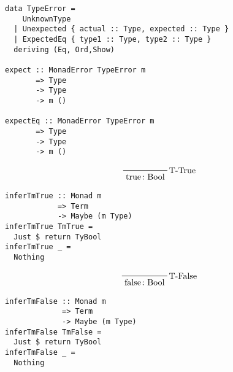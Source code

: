 \documentclass[aspectration=169]{beamer}
\begin{document}
\begin{frame}[fragile]
  \begin{verbatim}
data TypeError =
    UnknownType
  | Unexpected { actual :: Type, expected :: Type }
  | ExpectedEq { type1 :: Type, type2 :: Type }
  deriving (Eq, Ord,Show)

expect :: MonadError TypeError m 
       => Type 
       -> Type 
       -> m ()

expectEq :: MonadError TypeError m 
       => Type 
       -> Type 
       -> m ()
  \end{verbatim}
\end{frame}

\begin{frame}[fragile]
  \begin{displaymath}
    \prftree[r]{T-True}
    {\text{true} \colon \text{Bool}}
  \end{displaymath}
  \begin{verbatim}
inferTmTrue :: Monad m 
            => Term 
            -> Maybe (m Type)
inferTmTrue TmTrue =
  Just $ return TyBool
inferTmTrue _ =
  Nothing
  \end{verbatim}
\end{frame}

\begin{frame}[fragile]
  \begin{displaymath}
    \prftree[r]{T-False}
    {\text{false} \colon \text{Bool}}
  \end{displaymath}
  \begin{verbatim}
inferTmFalse :: Monad m 
             => Term 
             -> Maybe (m Type)
inferTmFalse TmFalse =
  Just $ return TyBool
inferTmFalse _ =
  Nothing
  \end{verbatim}
\end{frame}
\end{document}
